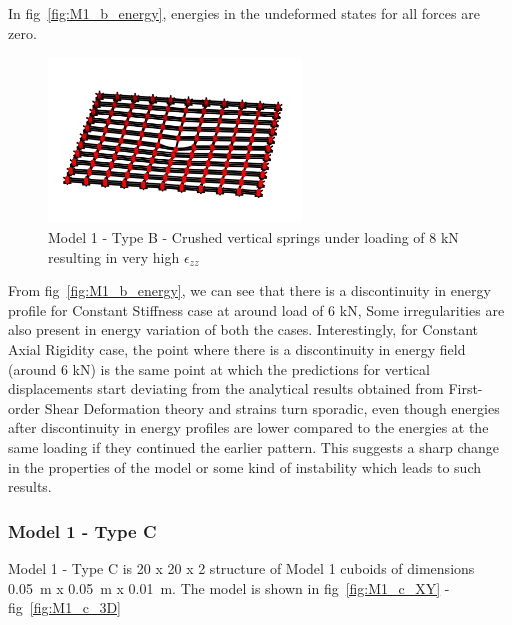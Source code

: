 In fig~\ref{fig:M1_b_energy}, energies in the undeformed states for all forces are zero.

\begin{figure}[!htbp]
    \centering
    \includegraphics[width = 0.6\textwidth]{Figures/crushed_M1_b.png}
    \caption{Model 1 - Type B - Crushed vertical springs under loading of 8 kN resulting in very high $\epsilon_{zz}$}
    \label{fig:crushed_M1_b}
\end{figure}

 From fig~\ref{fig:M1_b_energy}, we can see that there is a discontinuity in energy profile for Constant Stiffness case at around load of 6 kN, Some irregularities are also present in energy variation of both the cases. Interestingly, for Constant Axial Rigidity case, the point where there is a discontinuity in energy field (around 6 kN) is the same point at which the predictions for vertical displacements start deviating from the analytical results obtained from First-order Shear Deformation theory and strains turn sporadic, even though energies after discontinuity in energy profiles are lower compared to the energies at the same loading if they continued the earlier pattern. This suggests a sharp change in the properties of the model or some kind of instability which leads to such results. 
 
 \subsubsection{Model 1 - Type C}
 Model 1 - Type C is 20 x 20 x 2 structure of Model 1 cuboids of dimensions 0.05~m x 0.05~m x 0.01~m. The model is shown in fig~\ref{fig:M1_c_XY} - fig~\ref{fig:M1_c_3D}

